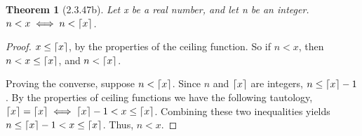 \documentclass[a4paper, 12pt]{article}
\theoremstyle{plain}
\newtheorem*{theorem*}{Theorem}
\DeclarePairedDelimiter{\ceil}{\lceil}{\rceil}
\begin{document}
	
	\begin{theorem*}[2.3.47b]
		Let x be a real number, and let n be an integer. \newline $n < x \iff n < \ceil{x}$.
	\end{theorem*}
	
	\begin{proof}
		$x \le \ceil{x}$, by the properties of the ceiling function. So if $n < x$, then $n < x \le \ceil{x}$, and $n < \ceil{x}$.
		
		Proving the converse, suppose $n < \ceil{x}$. Since $n$ and $\ceil{x}$ are integers, $n \le \ceil{x} - 1$. By the properties of ceiling functions we have the following tautology, $\ceil{x} = \ceil{x} \iff \ceil{x} - 1 < x \le \ceil{x}$. Combining these two inequalities yields $n \le \ceil{x} - 1 < x \le \ceil{x}$. Thus, $n < x$.
	\end{proof}
\end{document}
